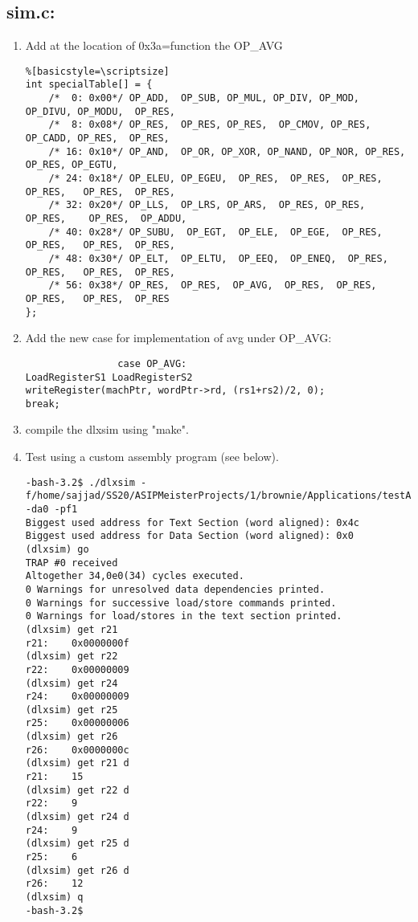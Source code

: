 \subsection{sim.c:}
\begin{enumerate}[resume]
\item Add at the location of 0x3a=function the OP\_AVG
\begin{lstlisting}%[basicstyle=\scriptsize]
int specialTable[] = {
	/*  0: 0x00*/ OP_ADD,  OP_SUB, OP_MUL, OP_DIV, OP_MOD,  OP_DIVU, OP_MODU,  OP_RES,
	/*  8: 0x08*/ OP_RES,  OP_RES, OP_RES,  OP_CMOV, OP_RES, OP_CADD, OP_RES,  OP_RES,
	/* 16: 0x10*/ OP_AND,  OP_OR, OP_XOR, OP_NAND, OP_NOR, OP_RES,  OP_RES, OP_EGTU,
	/* 24: 0x18*/ OP_ELEU, OP_EGEU,  OP_RES,  OP_RES,  OP_RES,  OP_RES,   OP_RES,  OP_RES,
	/* 32: 0x20*/ OP_LLS,  OP_LRS, OP_ARS,  OP_RES, OP_RES,  OP_RES,    OP_RES,  OP_ADDU,
	/* 40: 0x28*/ OP_SUBU,  OP_EGT,  OP_ELE,  OP_EGE,  OP_RES,  OP_RES,   OP_RES,  OP_RES,
	/* 48: 0x30*/ OP_ELT,  OP_ELTU,  OP_EEQ,  OP_ENEQ,  OP_RES,  OP_RES,   OP_RES,  OP_RES,
	/* 56: 0x38*/ OP_RES,  OP_RES,  OP_AVG,  OP_RES,  OP_RES,  OP_RES,   OP_RES,  OP_RES
};
\end{lstlisting}
\item Add the new case for implementation of avg under OP\_AVG:
\begin{lstlisting}
                case OP_AVG:
LoadRegisterS1 LoadRegisterS2
writeRegister(machPtr, wordPtr->rd, (rs1+rs2)/2, 0);
break;
\end{lstlisting}
\item compile the dlxsim using "make".
\item Test using a custom assembly program (see below).
\begin{lstlisting}
-bash-3.2$ ./dlxsim -f/home/sajjad/SS20/ASIPMeisterProjects/1/brownie/Applications/testAVG.dlxsim -da0 -pf1
Biggest used address for Text Section (word aligned): 0x4c
Biggest used address for Data Section (word aligned): 0x0
(dlxsim) go
TRAP #0 received
Altogether 34,0e0(34) cycles executed.
0 Warnings for unresolved data dependencies printed.
0 Warnings for successive load/store commands printed.
0 Warnings for load/stores in the text section printed.
(dlxsim) get r21
r21:    0x0000000f
(dlxsim) get r22
r22:    0x00000009
(dlxsim) get r24
r24:    0x00000009
(dlxsim) get r25
r25:    0x00000006
(dlxsim) get r26
r26:    0x0000000c
(dlxsim) get r21 d
r21:    15
(dlxsim) get r22 d
r22:    9
(dlxsim) get r24 d
r24:    9
(dlxsim) get r25 d
r25:    6
(dlxsim) get r26 d
r26:    12
(dlxsim) q
-bash-3.2$
\end{lstlisting}
\end{enumerate}

